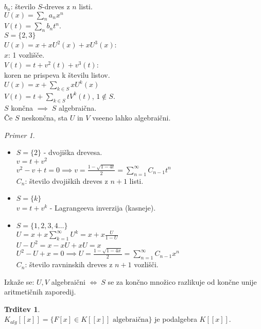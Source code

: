 \documentclass[a4paper, 12pt]{book}
\theoremstyle{definition}
\newtheorem{claim}[counter]{Trditev}
\theoremstyle{remark}
\newtheorem*{ex}{Primer}
\begin{document}
$b_n$: število $S$-dreves z $n$ listi. \\
$U(x) = \sum_n a_n x^n$ \\
$V(t) = \sum_n b_n t^n$. \\
$S = \{2,3\}$ \\
$U(x) = x + x U^2(x) + x U^3(x)$: \\
$x$: 1 vozlišče. \\
$V(t) = t + v^2(t) + v^3(t)$: \\
koren ne prispeva k številu listov. \\
$U(x) = x + \sum_{k \in S} x U^k(x)$ \\
$V(t) = t + \sum_{k \in S} t V^k(t)$, $1 \notin S$. \\
$S$ končna $\implies \; S$ algebraična. \\
Če $S$ neskončna, sta $U$ in $V$ vseeno lahko algebraični. \\
\begin{ex} \text{} \\
  \begin{itemize}
    \item $S = \{2\}$ - dvojiška drevesa. \\
      $v = t + v^2$ \\
      $v^2 - v + t = 0 \implies v = \frac{1-\sqrt{1-4t}}{2} = \sum_{n=1}^{\infty} C_{n-1} t^n$ \\
      $C_n$: število dvojiških dreves z $n+1$ listi. \\
    \item $S = \{k\}$ \\
      $v = t + v^k$ - Lagrangeeva inverzija (kasneje). \\
    \item $S = \{1, 2, 3, 4 \dots\}$ \\
      $U = x + x \sum_{k=1}^{\infty} U^k = x + x \frac{U}{1-U}$ \\
      $U - U^2 = x - xU + xU = x$ \\
      $U^2 - U + x = 0 \implies U = \frac{1-\sqrt{1-4x}}{2} = \sum_{n=1}^{\infty} C_{n-1} x^n$ \\
      $C_n$: število ravninskih dreves z $n+1$ vozlišči. \\
  \end{itemize}
  Izkaže se: $U,V$ algebraični $\iff \; S$ se za končno množico razlikuje od končne unije aritmetičnih zaporedij.
\end{ex}
\begin{claim} \text{} \\
  $K_{alg}[[x]] = \{F[x] \in K[[x]] \text{ algebraična}\}$ je podalgebra $K[[x]]$.
\end{claim}
\end{document}
